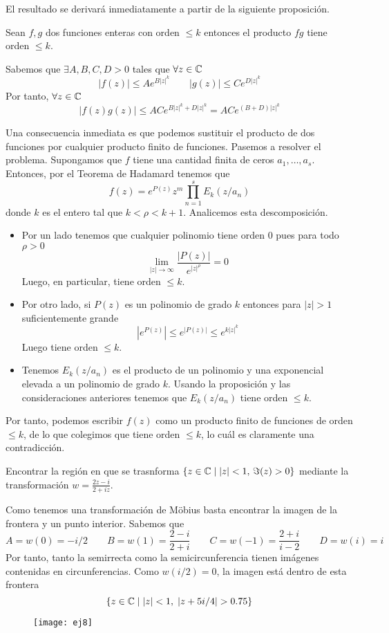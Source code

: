 \documentclass[twoside]{article}
\begin{document}
\begin{solucion}
El resultado se derivará inmediatamente a partir de la siguiente proposición. 
\begin{prop}
Sean $f,g$ dos funciones enteras con orden $\leq k$ entonces el producto $fg$ tiene orden $\leq k$.
\end{prop}
\begin{dem}
Sabemos que $\exists A,B,C,D>0$ tales que $\forall z\in \mathbb{C}$
$$
|f(z)|\leq Ae^{B|z|^k} \qquad |g(z)|\leq Ce^{D|z|^k}
$$
Por tanto, $\forall z \in \mathbb{C}$
$$
|f(z)g(z)| \leq ACe^{B|z|^k+D|z|^k} = ACe^{(B+D)|z|^k}
$$
\end{dem}
Una consecuencia inmediata es que podemos sustituir el producto de dos funciones por cualquier producto finito de funciones. Pasemos a resolver el problema. Supongamos que $f$ tiene una cantidad finita de ceros $a_1,\dotsc,a_s$. Entonces, por el Teorema de Hadamard tenemos que
$$
f(z)=e^{P(z)}z^m\prod_{n=1}^s E_k(z/a_n)
$$
donde $k$ es el entero tal que $k<\rho<k+1$. Analicemos esta descomposición. 
\begin{itemize}
\item Por un lado tenemos que cualquier polinomio tiene orden $0$ pues para todo $\rho>0$
$$
\lim_{|z|\to\infty} \frac{|P(z)|}{e^{|z|^\rho}} = 0
$$
Luego, en particular, tiene orden $\leq k$.
\item Por otro lado, si $P(z)$ es un polinomio de grado $k$ entonces para $|z|>1$ suficientemente grande
$$
|e^{P(z)}|\leq e^{|P(z)|}\leq e^{k|z|^k}
$$
Luego tiene orden $\leq k$. 
\item Tenemos $E_k(z/a_n)$ es el producto de un polinomio y una exponencial elevada a un polinomio de grado $k$. Usando la proposición y las consideraciones anteriores tenemos que $E_k(z/a_n)$ tiene orden $\leq k$. 
\end{itemize}
Por tanto, podemos escribir $f(z)$ como un producto finito de funciones de orden $\leq k$, de lo que colegimos que tiene orden $\leq k$, lo cuál es claramente una contradicción.
\end{solucion}
\newpage
\begin{ejercicio}{8}
Encontrar la región en que se trasnforma $\{z\in\mathbb{C}\mid |z|<1,\,\Im(z)>0\}$ mediante la transformación $w=\frac{2z-i}{2+iz}$.
\end{ejercicio}
\begin{solucion}
Como tenemos una transformación de Möbius basta encontrar la imagen de la frontera y un punto interior. Sabemos que $$A =w(0)=-i/2 \qquad B= w(1) = \frac{2-i}{2+i} \qquad C = w(-1) = \frac{2+i}{i-2} \qquad D=w(i) = i$$
Por tanto, tanto la semirrecta como la semicircunferencia tienen imágenes contenidas en circunferencias. Como $w(i/2)=0$, la imagen está dentro de esta frontera
$$
\{z\in \C \mid |z|< 1,\; |z+5i/4|>0.75\}
$$
\begin{figure}[h]
\texttt{[image: ej8]}
\centering
\end{figure}
\end{solucion}
\newpage
\end{document}
